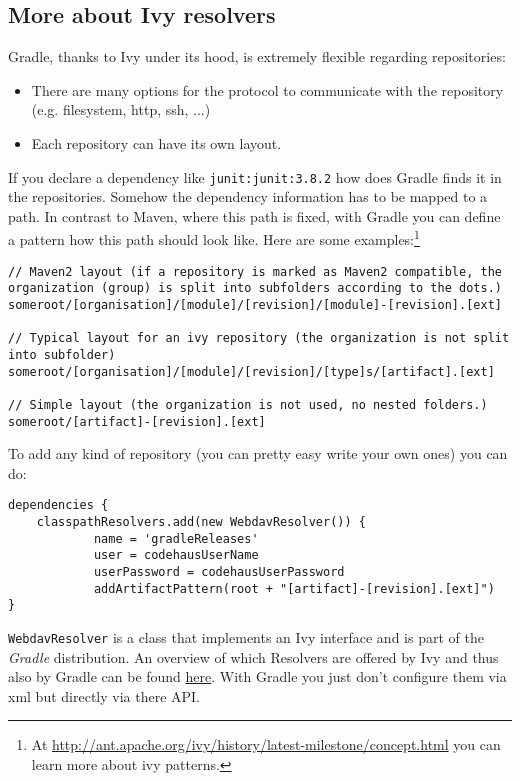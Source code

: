 \subsection{More about Ivy resolvers} %
\label{sub:more_about_ivy_resolvers}
Gradle, thanks to Ivy under its hood, is extremely flexible regarding repositories:
\begin{itemize}
	\item There are many options for the protocol to communicate with the repository (e.g. filesystem, http, ssh, ...)
	\item Each repository can have its own layout.
\end{itemize}
If you declare a dependency like \texttt{junit:junit:3.8.2} how does Gradle finds it in the repositories. Somehow the dependency information has to be mapped to a path. In contrast to Maven, where this path is fixed, with Gradle you can define a pattern how this path should look like. Here are some examples:\footnote{At \url{http://ant.apache.org/ivy/history/latest-milestone/concept.html} you can learn more about ivy patterns.}
\begin{Verbatim}
// Maven2 layout (if a repository is marked as Maven2 compatible, the organization (group) is split into subfolders according to the dots.)
someroot/[organisation]/[module]/[revision]/[module]-[revision].[ext]

// Typical layout for an ivy repository (the organization is not split into subfolder)
someroot/[organisation]/[module]/[revision]/[type]s/[artifact].[ext]

// Simple layout (the organization is not used, no nested folders.)
someroot/[artifact]-[revision].[ext]
\end{Verbatim}
To add any kind of repository (you can pretty easy write your own ones) you can do:
\begin{Verbatim}
dependencies {
	classpathResolvers.add(new WebdavResolver()) {
	        name = 'gradleReleases'
	        user = codehausUserName
	        userPassword = codehausUserPassword
	        addArtifactPattern(root + "[artifact]-[revision].[ext]")
}
\end{Verbatim}
\texttt{WebdavResolver} is a class that implements an Ivy interface and is part of the \emph{Gradle} distribution. An overview of which Resolvers are offered by Ivy and thus also by Gradle can be found \href{http://ant.apache.org/ivy/latest-milestone/configuration/resolvers.html}{here}. With Gradle you just don't configure them via xml but directly via there API.
